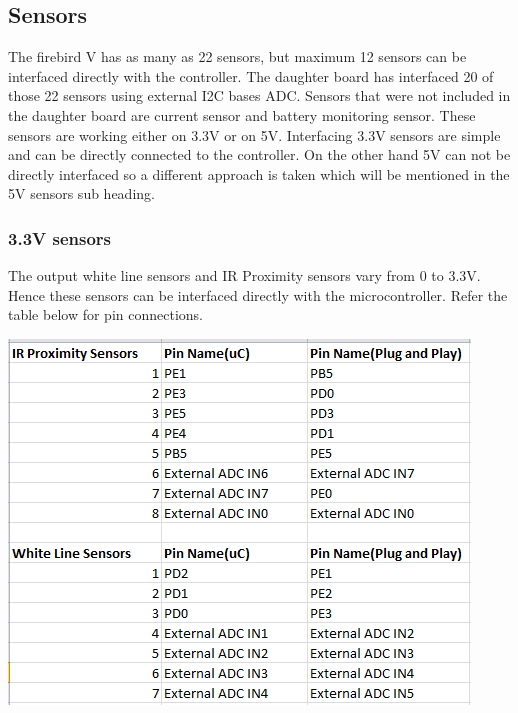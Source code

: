 \documentclass[a4paper,12pt,oneside]{article}
\begin{document}
{	\subsection{\textbf{Sensors}}{The firebird V has as many as 22 sensors, but maximum 12 sensors can be interfaced directly with the controller. The daughter board has interfaced 20 of those 22 sensors using external I2C bases ADC. Sensors that were not included in the daughter board are current sensor and battery monitoring sensor. These sensors are working either on 3.3V or on 5V. Interfacing 3.3V sensors are simple and can be directly connected to the controller. On the other hand 5V can not be directly interfaced so a different approach is taken which will be mentioned in the 5V sensors sub heading.}
		\subsubsection{\Large \textbf{3.3V sensors}}
		{The output white line sensors and IR Proximity sensors vary from 0  to 3.3V. Hence these sensors can be interfaced directly with the microcontroller. Refer the table below for pin connections.\\
		\begin{center}
		\includegraphics{Images/3v3Sensors}\\
		\end{center}
	}
}
\end{document}
